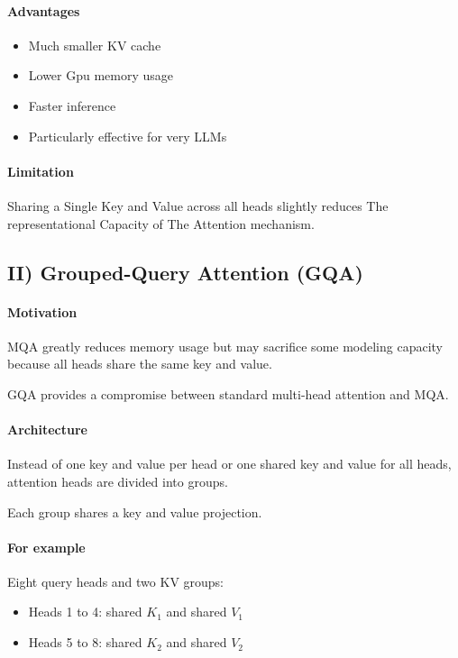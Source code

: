 \paragraph{Advantages}
\begin{itemize}
    \item Much smaller KV cache
    \item Lower Gpu memory usage
    \item Faster inference
    \item Particularly effective for very LLMs
\end{itemize}

\paragraph{Limitation} Sharing a Single Key and Value across all heads slightly reduces The representational Capacity of The Attention mechanism.

\subsection{II) Grouped-Query Attention (GQA)}

\paragraph{Motivation} MQA greatly reduces memory usage but may sacrifice some modeling capacity because all heads share the same key and value.

GQA provides a compromise between standard multi-head attention and MQA.

\paragraph{Architecture} Instead of one key and value per head or one shared key and value for all heads, attention heads are divided into groups.

Each group shares a key and value projection.

\paragraph{For example} Eight query heads and two KV groups:
\begin{itemize}
    \item Heads 1 to 4: shared $K_1$ and shared $V_1$
    \item Heads 5 to 8: shared $K_2$ and shared $V_2$
\end{itemize}


